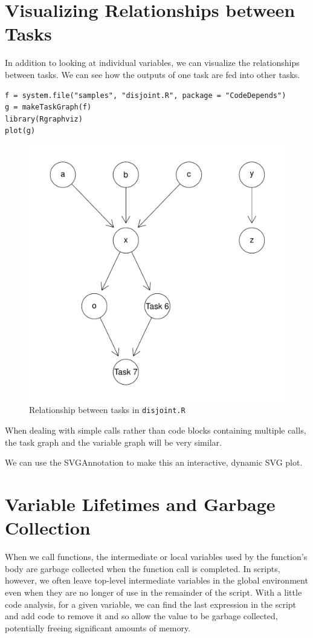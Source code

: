 \documentclass{article}
\begin{document}
\section{Visualizing Relationships between Tasks}
In addition to looking at individual variables, we
can visualize the relationships between tasks.
We can see how the outputs of one task are fed into 
other tasks. 
\begin{verbatim}
f = system.file("samples", "disjoint.R", package = "CodeDepends")
g = makeTaskGraph(f)
library(Rgraphviz)
plot(g)
\end{verbatim}
\begin{figure}
  \centering
  \includegraphics{taskGraph.pdf}
  \caption{Relationship between tasks in \texttt{disjoint.R}}
\end{figure}

When dealing with simple calls rather than 
code blocks containing multiple calls, the task graph
and the variable graph will be very similar.

We can use the SVGAnnotation to make this an interactive,
dynamic SVG plot.


\section{Variable Lifetimes and Garbage Collection}
When we call  functions, the intermediate or local variables
used by the function's body are garbage collected when the function
call is completed. In scripts, however, we often leave top-level intermediate
variables in the global environment even when they are no longer of
use in the remainder of the script.
With a little code analysis, for a given variable,
we can find the last expression in the script and 
add code to remove it and so allow the value to be garbage collected,
potentially freeing significant amounts of memory.
\end{document}
